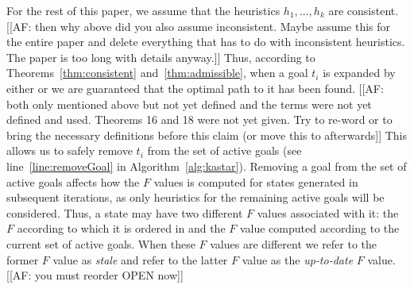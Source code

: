For the rest of this paper, we assume that the heuristics $h_1,\ldots, h_k$ are consistent.
[[AF: then why above did you also assume inconsistent. Maybe assume this for the entire paper and delete everything that has to do with inconsistent heuristics. The paper is too long with details anyway.]]
Thus, according to Theorems~\ref{thm:consistent} and~\ref{thm:admissible}, when a goal $t_i$ is expanded by either \kastarmax or \kastarmin we are guaranteed that the optimal path to it has been found.
[[AF: both only mentioned above but not yet defined and the terms were not yet defined and used. Theorems 16 and 18 were not yet given. Try to re-word or to bring the necessary definitions before this claim (or move this to afterwards]]
This allows us to safely remove $t_i$ from the set of active goals (see line~\ref{line:removeGoal} in Algorithm~\ref{alg:kastar}).
Removing a goal from the set of active goals affects how the $F$ values is computed for states generated in subsequent \kastar iterations, as only heuristics for the remaining active goals will be considered.
Thus, a state may have two different $F$ values associated with it: the $F$ according to which it is ordered in \open and the $F$ value computed according to the current set of active goals.
When these $F$ values are different we refer to the former $F$ value as \emph{stale} and refer to the latter $F$ value as the \emph{up-to-date} $F$ value. [[AF: you must reorder OPEN now]]



